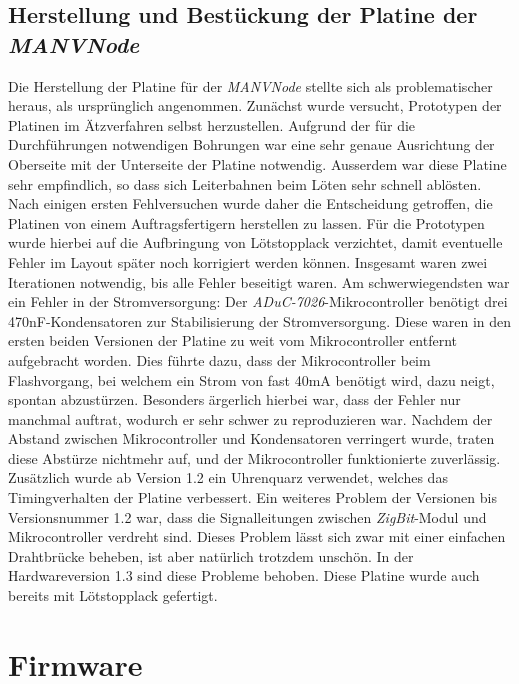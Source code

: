 \subsection{Herstellung und Bestückung der Platine der \emph{MANVNode}}
Die Herstellung der Platine für der \emph{MANVNode} stellte sich als problematischer heraus, als ursprünglich 
angenommen. Zunächst wurde versucht, Prototypen der Platinen im Ätzverfahren selbst herzustellen. Aufgrund der 
für die Durchführungen notwendigen Bohrungen war eine sehr genaue Ausrichtung der Oberseite mit der Unterseite 
der Platine notwendig. Ausserdem war diese Platine sehr empfindlich, so dass sich Leiterbahnen beim Löten
sehr schnell ablösten. Nach einigen ersten Fehlversuchen wurde daher die Entscheidung getroffen, die Platinen
von einem Auftragsfertigern herstellen zu lassen. Für die Prototypen wurde hierbei auf die Aufbringung von 
Lötstopplack verzichtet, damit eventuelle Fehler im Layout später noch korrigiert werden können. Insgesamt waren
zwei Iterationen notwendig, bis alle Fehler beseitigt waren. Am schwerwiegendsten war ein Fehler in der 
Stromversorgung: Der \emph{ADuC-7026}-Mikrocontroller benötigt drei 470nF-Kondensatoren zur Stabilisierung der
Stromversorgung. Diese waren in den ersten beiden Versionen der Platine zu weit vom Mikrocontroller entfernt 
aufgebracht worden. Dies führte dazu, dass der Mikrocontroller beim Flashvorgang, bei welchem ein Strom von fast
40mA benötigt wird, dazu neigt, spontan abzustürzen. Besonders ärgerlich hierbei war, dass der Fehler nur manchmal
auftrat, wodurch er sehr schwer zu reproduzieren war. Nachdem der Abstand zwischen Mikrocontroller und Kondensatoren
verringert wurde, traten diese Abstürze nichtmehr auf, und der Mikrocontroller funktionierte zuverlässig. Zusätzlich
wurde ab Version 1.2 ein Uhrenquarz verwendet, welches das Timingverhalten der Platine verbessert. Ein weiteres
Problem der Versionen bis Versionsnummer 1.2 war, dass die Signalleitungen zwischen \emph{ZigBit}-Modul und
Mikrocontroller verdreht sind. Dieses Problem lässt sich zwar mit einer einfachen Drahtbrücke beheben, ist aber
natürlich trotzdem unschön. In der Hardwareversion 1.3 sind diese Probleme behoben. Diese Platine wurde auch bereits
mit Lötstopplack gefertigt.  

\section{Firmware}
